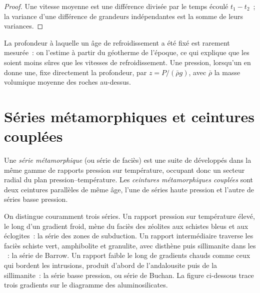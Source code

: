 \begin{proof}
Une vitesse moyenne est une différence divisée par le temps écoulé $t_1 - t_2$~; la variance d'une
différence de grandeurs indépendantes est la somme de leurs variances.
\end{proof}

La profondeur à laquelle un âge de refroidissement a été fixé est rarement mesurée~: on l'estime à partir du
géotherme de l'époque, ce qui explique que les  soient moins sûres que les vitesses de refroidissement.
Une pression, lorsqu'un  en donne une, fixe directement la profondeur, par
$z = P/(\bar\rho g)$, avec $\bar\rho$ la masse volumique moyenne des roches au-dessus.

\section{Séries métamorphiques et ceintures couplées}\label{sec:b2:pt-paths:series}

\begin{definition}\label{def:b2:pt-paths:series}
Une \emph{série métamorphique} (ou série de faciès) est une suite de
 développés dans la même gamme de rapports pression sur température,
occupant donc un secteur radial du plan pression--température.
Les \emph{ceintures métamorphiques couplées} sont deux ceintures parallèles de
même âge, l'une de séries haute pression et l'autre de séries basse pression.
\end{definition}

On distingue couramment trois séries. Un rapport pression sur température élevé, le long d'un
gradient froid, mène du faciès des zéolites aux schistes bleus et aux éclogites~: la série
des zones de subduction. Un rapport intermédiaire traverse les faciès schiste vert, amphibolite et
granulite, avec disthène puis sillimanite dans les ~: la série de Barrow. Un rapport faible
le long de gradients chauds comme ceux qui bordent les intrusions, produit d'abord de l'andalousite puis
de la sillimanite~: la série basse pression, ou série de Buchan. La figure ci-dessous trace trois gradients
sur le diagramme des aluminosilicates.

